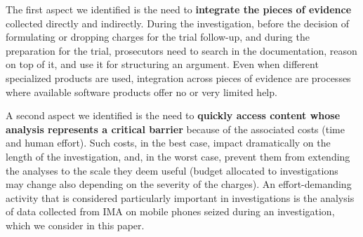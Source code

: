 The first aspect we identified is the need to \textbf{integrate the pieces of evidence} collected directly and indirectly. During the investigation, before the decision of formulating or dropping charges for the trial follow-up, and during the preparation for the trial, prosecutors need to search in the documentation, reason on top of it, and use it for structuring an argument. Even when different specialized products are used, integration across pieces of evidence
are processes where available software products offer no or very limited help.   

A second aspect we identified is the need to \textbf{quickly access content whose analysis represents a critical barrier} because of the associated costs (time and human effort). Such costs, in the best case,  impact dramatically on the length of the investigation, and, in the worst case, prevent them from extending the analyses to the scale they deem useful (budget allocated to investigations may change also depending on the severity of the charges).
%
An effort-demanding activity that is considered particularly important in investigations is the analysis of data collected from IMA on mobile phones seized during an investigation, which we consider in this paper.  





